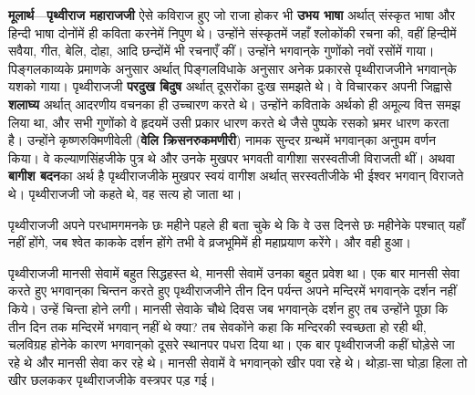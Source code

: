 \begin{sloppypar}\justifying{}
\textbf{मूलार्थ}—\textbf{पृथ्वीराज महाराजजी} ऐसे कविराज हुए जो राजा होकर भी \textbf{उभय भाषा} अर्थात् संस्कृत भाषा और हिन्दी भाषा दोनोंमें ही कविता करनेमें निपुण थे। उन्होंने संस्कृतमें जहाँ श्लोकोंकी रचना की, वहीं हिन्दीमें सवैया, गीत, बेलि, दोहा, आदि छन्दोंमें भी रचनाएँ कीं। उन्होंने भगवान्‌के गुणोंको नवों रसोंमें गाया। पिङ्गलकाव्यके प्रमाणके अनुसार अर्थात् पिङ्गलविधाके अनुसार अनेक प्रकारसे पृथ्वीराजजीने भगवान्‌के यशको गाया। पृथ्वीराजजी \textbf{परदुख बिदुष} अर्थात् दूसरोंका दुःख समझते थे। वे विचारकर अपनी जिह्वासे \textbf{शलाघ्य} अर्थात् आदरणीय वचनका ही उच्चारण करते थे। उन्होंने कविताके अर्थको ही अमूल्य वित्त समझ लिया था, और सभी गुणोंको वे हृदयमें उसी प्रकार धारण करते थे जैसे पुष्पके रसको भ्रमर धारण करता है। उन्होंने कृष्ण\-रुक्मिणी\-वेली (\textbf{वेलि क्रिसन\-रुकमणीरी}) नामक सुन्दर ग्रन्थमें भगवान्‌का अनुपम वर्णन किया। वे कल्याण\-सिंहजीके पुत्र थे और उनके मुखपर भगवती वागीशा सरस्वतीजी विराजती थीं। अथवा \textbf{बागीश बदन}का अर्थ है पृथ्वीराजजीके मुखपर स्वयं वागीश अर्थात् सरस्वतीजीके भी ईश्वर भगवान् विराजते थे। पृथ्वीराजजी जो कहते थे, वह सत्य हो जाता था।
\end{sloppypar}
\begin{sloppypar}\justifying{}
पृथ्वीराजजी अपने परधाम\-गमनके छः महीने पहले ही बता चुके थे कि वे उस दिनसे छः महीनेके पश्चात् यहाँ नहीं होंगे, जब श्वेत काकके दर्शन होंगे तभी वे व्रजभूमिमें ही महाप्रयाण करेंगे। और वही हुआ।
\end{sloppypar}
\begin{sloppypar}\justifying{}
पृथ्वीराजजी मानसी सेवामें बहुत सिद्धहस्त थे, मानसी सेवामें उनका बहुत प्रवेश था। एक बार मानसी सेवा करते हुए भगवान्‌का चिन्तन करते हुए पृथ्वीराजजीने तीन दिन पर्यन्त अपने मन्दिरमें भगवान्‌के दर्शन नहीं किये। उन्हें चिन्ता होने लगी। मानसी सेवाके चौथे दिवस जब भगवान्‌के दर्शन हुए तब उन्होंने पूछा कि तीन दिन तक मन्दिरमें भगवान् नहीं थे क्या? तब सेवकोंने कहा कि मन्दिरकी स्वच्छता हो रही थी, चलविग्रह होनेके कारण भगवान्‌को दूसरे स्थानपर पधरा दिया था। एक बार पृथ्वीराजजी कहीं घोड़ेसे जा रहे थे और मानसी सेवा कर रहे थे। मानसी सेवामें वे भगवान्‌को खीर पवा रहे थे। थोड़ा-सा घोड़ा हिला तो खीर छलककर पृथ्वीराजजीके वस्त्रपर पड़ गई।
\end{sloppypar}


